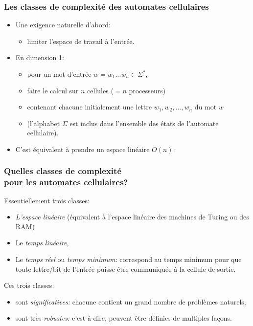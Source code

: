 \documentclass[8pt]{beamer}
\begin{document}
\frame
{
  \frametitle{Les classes de complexité des automates cellulaires}
  
 \begin{itemize}
\item Une exigence naturelle d'abord: 
\begin{itemize}
\item limiter l'espace de travail à l'entrée.
\end{itemize}

\item En dimension 1: 
\begin{itemize}
\item pour un mot d'entrée $w=w_1\ldots w_n\in\Sigma^*$, 
\item faire le calcul sur $n$ cellules ($ = n$ processeurs)
\item contenant chacune initialement une lettre $w_1,w_2,\ldots,w_n$ du mot $w$ 
\item (l'alphabet $\Sigma$ est inclus dans l'ensemble des états de l'automate cellulaire).
\end{itemize}

\item C'est équivalent à prendre un espace linéaire $O(n)$.
\end{itemize}
}
\frame
{
\frametitle{Quelles classes de complexité\\ pour les automates cellulaires?}
Essentiellement trois classes:
\begin{itemize}
\item \emph{L'espace linéaire} (équivalent à l'espace linéaire des machines de Turing ou des RAM)
\item Le \emph{temps linéaire},
\item Le \emph{temps réel} ou \emph{temps minimum}: correspond au temps minimum pour que toute lettre/bit de l'entrée puisse être communiquée à la cellule de sortie.
\end{itemize}

\bigskip
Ces trois classes:
\begin{itemize}
\item sont \emph{significatives:} chacune contient un grand nombre de problèmes naturels,
\item sont très \emph{robustes:} c'est-à-dire, peuvent être définies de multiples façons.
\end{itemize}
}
\frame
\end{document}
